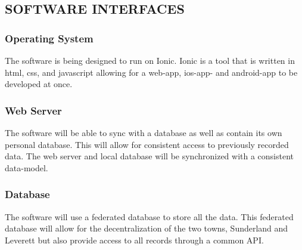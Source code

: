 \documentclass[twoside,letterpaper]{article}
\begin{document}
\subsection[SOFTWARE INTERFACES]{\rmfamily\bfseries\color{black}
SOFTWARE INTERFACES}
{\rmfamily\color{black}
\subsubsection{Operating System} 
The software is being designed to run on Ionic. Ionic is a tool that is written in html, css, and javascript allowing for a web-app, ios-app- and android-app to be developed at once.
\subsubsection{Web Server}
The software will be able to sync with a database as well as contain its own personal database. This will allow for consistent access to previously recorded data. The web server and local database will be synchronized with a consistent data-model. 
\subsubsection{Database}
The software will use a federated database to store all the data. This federated database will allow for the decentralization of the two towns, Sunderland and Leverett but also provide access to all records through a common API. }
\end{document}
